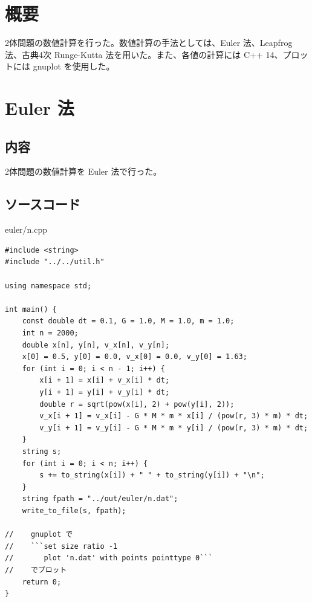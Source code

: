 \documentclass[a4paper,twoside]{jarticle}
\begin{document}

\maketitle

\section{概要}
2体問題の数値計算を行った。数値計算の手法としては、Euler 法、Leapfrog 法、古典4次 Runge-Kutta 法を用いた。また、各値の計算には C++ 14、プロットには gnuplot を使用した。

\section{Euler 法}\label{s-euler}

\subsection{内容}
2体問題の数値計算を Euler 法で行った。

\subsection{ソースコード}
euler/n.cpp
\begin{lstlisting}[]
#include <string>
#include "../../util.h"

using namespace std;

int main() {
    const double dt = 0.1, G = 1.0, M = 1.0, m = 1.0;
    int n = 2000;
    double x[n], y[n], v_x[n], v_y[n];
    x[0] = 0.5, y[0] = 0.0, v_x[0] = 0.0, v_y[0] = 1.63;
    for (int i = 0; i < n - 1; i++) {
        x[i + 1] = x[i] + v_x[i] * dt;
        y[i + 1] = y[i] + v_y[i] * dt;
        double r = sqrt(pow(x[i], 2) + pow(y[i], 2));
        v_x[i + 1] = v_x[i] - G * M * m * x[i] / (pow(r, 3) * m) * dt;
        v_y[i + 1] = v_y[i] - G * M * m * y[i] / (pow(r, 3) * m) * dt;
    }
    string s;
    for (int i = 0; i < n; i++) {
        s += to_string(x[i]) + " " + to_string(y[i]) + "\n";
    }
    string fpath = "../out/euler/n.dat";
    write_to_file(s, fpath);

//    gnuplot で
//    ```set size ratio -1
//       plot 'n.dat' with points pointtype 0```
//    でプロット
    return 0;
}
\end{lstlisting}
\end{document}
